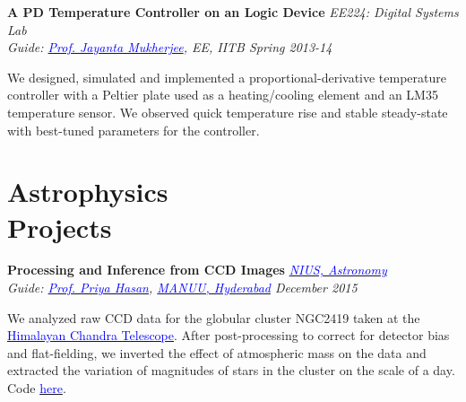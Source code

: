 \documentclass[margin,line]{res}
\newenvironment{list1}{
  \begin{list}{\ding{113}}{%
      \setlength{\itemsep}{0in}
      \setlength{\parsep}{0in} \setlength{\parskip}{0in}
      \setlength{\topsep}{0in} \setlength{\partopsep}{0in} 
      \setlength{\leftmargin}{0.17in}}}{\end{list}}
\begin{document}
\begin{resume}
\vspace*{-0.1in}

{\bf A PD Temperature Controller on an Logic Device} \hfill \textit{EE224: Digital Systems Lab} \\
{\em Guide: \href{https://www.ee.iitb.ac.in/wiki/faculty/jayanta}{\textcolor{blue}{Prof. Jayanta Mukherjee}}, EE, IITB \hfill Spring 2013-14} \\
\vspace*{-.15in}
\begin{list1}
\item[] We designed, simulated and implemented a proportional-derivative temperature controller with a Peltier plate used as a heating/cooling element and an LM35 temperature sensor. We observed quick temperature rise and stable steady-state with best-tuned parameters for the controller.
\end{list1}

\vspace*{-0.1in}

\section{\sc Astrophysics \\Projects}
{\bf Processing and Inference from CCD Images} \hfill \textit{\href{http://nius.hbcse.tifr.res.in/}{\textcolor{blue} {NIUS, Astronomy}}} \\
{\em Guide: \href{http://http://manuu.ac.in/deptphysc_faclty.php/}{\textcolor{blue}{Prof. Priya Hasan}}, \href{http://manuu.ac.in/}{\textcolor{blue} {MANUU, Hyderabad}} \hfill December 2015} \\
\vspace*{-.15in}
\begin{list1}
\item[] We analyzed raw CCD data for the globular cluster NGC2419 taken at the \href{http://www.iiap.res.in/iao/cycle.html}{\textcolor{blue} {Himalayan Chandra Telescope}}. After post-processing to correct for detector bias and flat-fielding, we inverted the effect of atmospheric mass on the data and extracted the variation of magnitudes of stars in the cluster on the scale of a day. Code \href{hhttps://github.com/alankarkotwal/ngc2419-variables}{\textcolor{blue} {here}}.
\end{list1}


\end{resume}
\end{document}
